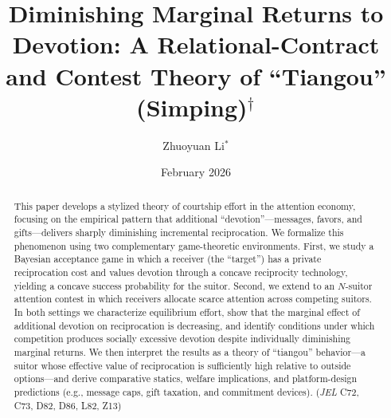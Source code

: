 \documentclass[AER]{AEA}
\begin{document}
\title{Diminishing Marginal Returns to Devotion: A Relational-Contract and Contest Theory of ``Tiangou'' (Simping)$^\dagger$}

\author{Zhuoyuan Li$^*$}
\date{February 2026}

\begin{abstract}
This paper develops a stylized theory of courtship effort in the attention economy,
focusing on the empirical pattern that additional ``devotion''---messages, favors, and
gifts---delivers sharply diminishing incremental reciprocation. We formalize this
phenomenon using two complementary game-theoretic environments. First, we study a
Bayesian acceptance game in which a receiver (the ``target'') has a private reciprocation
cost and values devotion through a concave reciprocity technology, yielding a concave
success probability for the suitor. Second, we extend to an $N$-suitor attention contest
in which receivers allocate scarce attention across competing suitors. In both settings
we characterize equilibrium effort, show that the marginal effect of additional devotion
on reciprocation is decreasing, and identify conditions under which competition produces
socially excessive devotion despite individually diminishing marginal returns. We then
interpret the results as a theory of ``tiangou'' behavior---a suitor whose effective value of
reciprocation is sufficiently high relative to outside options---and derive comparative
statics, welfare implications, and platform-design predictions (e.g., message caps, gift
taxation, and commitment devices).
\noindent (\textit{JEL} C72, C73, D82, D86, L82, Z13)
\end{abstract}

\maketitle

\let\thefootnote\relax{}
\let\thefootnote\relax{}

\def\thefootnote{\arabic{footnote}}
\setcounter{footnote}{0}
\end{document}
